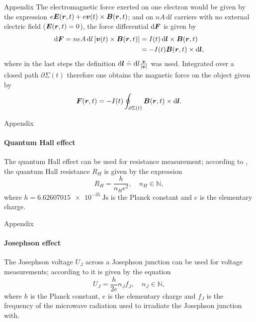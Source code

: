 \documentclass{beamer}
\begin{document}
\begin{frame}[allowframebreaks]{Appendix}
 The electromagnetic force exerted on one electron would be given by the expression $e\bm{E}(\bm{r},t) + e\bm{v}(t) \times \bm{B}(\bm{r},t)$; and on $nA\,\mathrm{d}l$ carriers with no external electric field ($\bm{E}(\bm{r},t) = 0$), the force differential $\mathrm{d}\bm{F}$ is given by 
 \begin{align}\begin{aligned}
		\mathrm{d}\bm{F} = neA\,\mathrm{d}l \left[\bm{v}(t)\times \bm{B}(\bm{r},t)\right] &= I(t)\,\mathrm{d}\bm{l}\times \bm{B}(\bm{r},t) \\ &= -I(t)\bm{B}(\bm{r},t)\times \mathrm{d}\bm{l},
	\end{aligned}\end{align} where in the last steps the definition $\mathrm{d}\bm{l} \doteq \mathrm{d}l\frac{\bm{v}}{|\bm{v}|}$ was used. Integrated over a closed path $\partial \Sigma(t)$ therefore one obtains the magnetic force on the object given by \begin{equation}\label{eq:watt_bal_fund_eq_2}
	\bm{F}(\bm{r},t) = -I(t)\oint_{\partial \Sigma(t)} \bm{B}(\bm{r},t)\times \mathrm{d}\bm{l}.
	\end{equation}
\end{frame}

\begin{frame}[allowframebreaks]{Appendix}
\framesubtitle{Quantum Hall effect}
\justifying
	The quantum Hall effect can be used for resistance measurement; according to \cite{B_Jeckelmann_2001}, the quantum Hall resistance $R_H$ is given by the expression \begin{equation}\label{eq:quantumhalleffect}
		R_H = \frac{h}{n_He^2}, \quad n_H \in \mathbb{N},
	\end{equation} where $h = \SI{6.62607015e-35}{\joule\second}$ is the Planck constant and $e$ is the elementary charge.
\end{frame}

\begin{frame}[allowframebreaks]{Appendix}
\framesubtitle{Josephson effect}
\justifying
	The Josephson voltage $U_J$ across a Josephson junction can be used for voltage measurements; according to \cite{Kajastie_2009} it is given by the equation \begin{equation}\label{eq:josephsoneffect}
		U_J = \frac{h}{2e}n_Jf_J, \quad n_J \in \mathbb{N},
	\end{equation} where $h$ is the Planck constant, $e$ is the elementary charge and $f_J$ is the frequency of the microwave radiation used to irradiate the Josephson junction with.
\end{frame}
\end{document}
